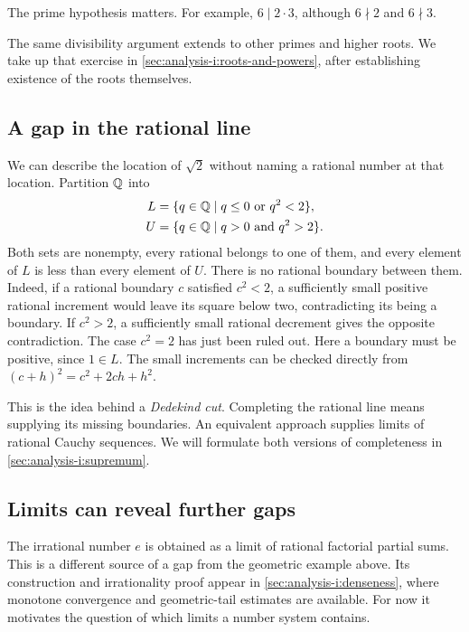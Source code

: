The prime hypothesis matters. For example, $6\mid2\cdot3$, although
$6\nmid2$ and $6\nmid3$.

The same divisibility argument extends to other primes and higher roots.
We take up that exercise in \autoref{sec:analysis-i:roots-and-powers},
after establishing existence of the roots themselves.

\subsection{A gap in the rational line}
We can describe the location of $\sqrt{2}$ without naming a rational number
at that location. Partition $\mathbb{Q}$ into
\begin{align*}
  L&=\{q\in\mathbb{Q}\mid q\leq0\text{ or }q^2<2\},\\
  U&=\{q\in\mathbb{Q}\mid q>0\text{ and }q^2>2\}.
\end{align*}
Both sets are nonempty, every rational belongs to one of them, and every
element of $L$ is less than every element of $U$. There is no rational
boundary between them. Indeed, if a rational boundary $c$ satisfied $c^2<2$,
a sufficiently small positive rational increment would leave its square
below two, contradicting its being a boundary. If $c^2>2$, a sufficiently
small rational decrement gives the opposite contradiction. The case $c^2=2$
has just been ruled out. Here a boundary must be positive, since $1\in L$.
The small increments can be checked directly from
$(c+h)^2=c^2+2ch+h^2$.


This is the idea behind a \emph{Dedekind cut}. Completing the rational line
means supplying its missing boundaries. An equivalent approach supplies
limits of rational Cauchy sequences. We will formulate both versions of
completeness in \autoref{sec:analysis-i:supremum}.

\subsection{Limits can reveal further gaps}
The irrational number $e$ is obtained as a limit of rational factorial
partial sums. This is a different source of a gap from
the geometric example above. Its construction and irrationality proof
appear in \autoref{sec:analysis-i:denseness}, where monotone convergence
and geometric-tail estimates are available. For now it motivates the
question of which limits a number system contains.
